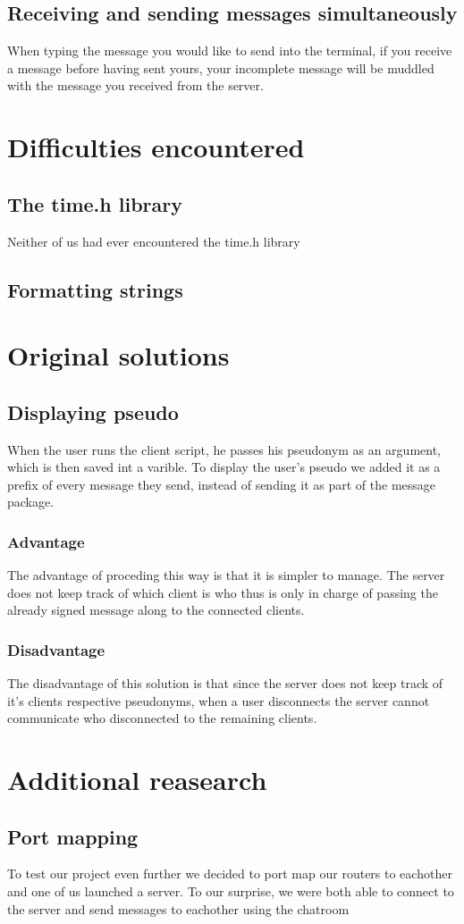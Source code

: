 \documentclass[utf8]{article}
\begin{document}
\subsection{Receiving and sending messages simultaneously}
When typing the message you would like to send into the terminal, if you receive a message before having sent yours, your incomplete message will be muddled with the message you received from the server.

\section{Difficulties encountered}

\subsection{The time.h library}

Neither of us had ever encountered the time.h library

\subsection{Formatting strings}

\newpage

\section{Original solutions}

\subsection{Displaying pseudo}
When the user runs the client script, he passes his pseudonym as an argument, which is then saved int a varible. To display the user's pseudo we added it as a prefix of every message they send, instead of sending it as part of the message package. 

\subsubsection{Advantage}
The advantage of proceding this way is that it is simpler to manage. The server does not keep track of which client is who thus is only in charge of passing the already signed message along to the connected clients.
\subsubsection{Disadvantage}
The disadvantage of this solution is that since the server does not keep track of it's clients respective pseudonyms, when a user disconnects the server cannot communicate who disconnected to the remaining clients.

\section{Additional reasearch}

\subsection{Port mapping}
To test our project even further we decided to port map our routers to eachother and one of us launched a server. To our surprise, we were both able to connect to the server and send messages to eachother using the chatroom
\end{document}
